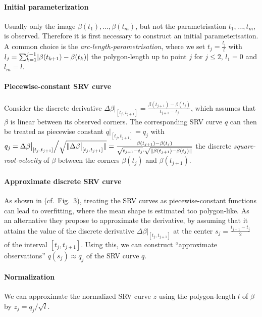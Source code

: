 \paragraph{Initial parameterization}
Usually only the image $\beta(t_1),\dots,\beta(t_m)$, but not the parametrisation $t_1,\dots,t_m$, is observed.
Therefore it is first necessary to construct an initial parameterisation.
A common choice is the \emph{arc-length-parametrisation}, where we set $t_j = \frac{l_j}{l}$ with $l_j = \sum_{k=1}^{j-1} \lvert\beta(t_{k+1}) - \beta(t_k)\rvert$ the polygon-length up to point $j$ for $j \leq 2$, $l_1 = 0$ and $l_m = l$.

\paragraph{Piecewise-constant SRV curve} 
Consider the discrete derivative $\Delta \beta \big\rvert_{[t_j, t_{j+1}]} = \frac{\beta(t_{j+1}) - \beta(t_{j})}{t_{j+1} - t_j}$, which assumes that $\beta$ is linear between its observed corners. 
The corresponding SRV curve $q$ can then be treated as piecewise constant $q\big\rvert_{[t_{j},t_{j+1}]} = q_j$ with $q_j = \Delta \beta \big\rvert_{[t_j, t_{j+1}]} \Big/ \sqrt{\lVert\Delta \beta \big\rvert_{[t_j, t_{j+1}]}\rVert} = \frac{\beta(t_{j+1}) - \beta(t_j)}{\sqrt{t_{j+1} - t_j} \cdot \sqrt{\lVert\beta(t_{j+1}) - \beta(t_j)\rVert}}$ the discrete \emph{square-root-velocity} of $\beta$ between the corners $\beta(t_j)$ and $\beta(t_{j+1})$.

\paragraph{Approximate discrete SRV curve} As shown in \cite{Steyer2021} (cf.\ Fig.\ 3), treating the SRV curves as piecewise-constant functions can lead to overfitting, where the mean shape is estimated too polygon-like.
As an alternative they propose to approximate the derivative, by assuming that it attains the value of the discrete derivative $\Delta \beta \big\rvert_{[t_j,t_{j+1}]}$ at the center $s_j = \frac{t_{j+1} - t_j}{2}$ of the interval $[t_j, t_{j+1}]$.
Using this, we can construct \enquote{approximate observations} $q(s_j) \approx q_j$ of the SRV curve $q$.

\paragraph{Normalization}
We can approximate the normalized SRV curve $z$ using the polygon-length $l$ of $\beta$ by $z_j = q_j \big/ \sqrt{l}$.

